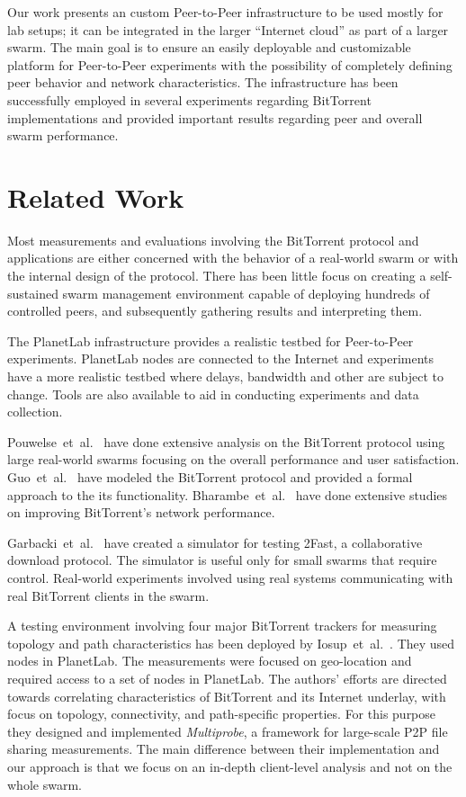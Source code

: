 Our work presents an custom Peer-to-Peer infrastructure to be used mostly for
lab setups; it can be integrated in the larger ``Internet cloud'' as part of a
larger swarm. The main goal is to ensure an easily deployable and customizable
platform for Peer-to-Peer experiments with the possibility of completely
defining peer behavior and network characteristics. The infrastructure has
been successfully employed in several experiments regarding BitTorrent
implementations and provided important results regarding peer and overall
swarm performance.

\section{Related Work}

Most measurements and evaluations involving the BitTorrent protocol and
applications are either concerned with the behavior of a real-world swarm or
with the internal design of the protocol. There has been little focus on
creating a self-sustained swarm management environment capable of deploying
hundreds of controlled peers, and subsequently gathering results and
interpreting them.

The PlanetLab infrastructure provides a realistic testbed for
Peer-to-Peer experiments. PlanetLab nodes are connected to the Internet and
experiments have a more realistic testbed where delays, bandwidth and other
are subject to change. Tools are also available to aid in conducting
experiments and data collection.

Pouwelse~et~al.~\cite{measurement-study} have done extensive analysis on the
BitTorrent protocol using large real-world swarms focusing on the overall
performance and user satisfaction. Guo~et~al.~\cite{guo} have modeled the
BitTorrent protocol and provided a formal approach to the its functionality.
Bharambe~et~al.~\cite{bt-analysis} have done extensive studies on improving
BitTorrent's network performance.

Garbacki~et~al.~\cite{garbacki} have created a simulator for testing 2Fast, a
collaborative download protocol. The simulator is useful only for small swarms
that require control. Real-world experiments involved using real systems
communicating with real BitTorrent clients in the swarm.

A testing environment involving four major BitTorrent trackers for measuring
topology and path characteristics has been deployed by
Iosup~et~al.~\cite{corr-overlay}. They used nodes in PlanetLab. The
measurements were focused on geo-location and required access to a set of
nodes in PlanetLab. The authors' efforts are directed towards correlating
characteristics of BitTorrent and its Internet underlay, with focus on
topology, connectivity, and path-specific properties. For this purpose they
designed and implemented \textit{Multiprobe}, a framework for large-scale P2P
file sharing measurements. The main difference between their implementation
and our approach is that we focus on an in-depth client-level analysis and not
on the whole swarm.

